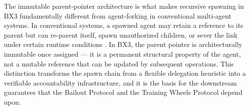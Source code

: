 The immutable parent-pointer architecture is what makes recursive spawning in BX3 fundamentally different from agent-forking in conventional multi-agent systems. In conventional systems, a spawned agent may retain a reference to its parent but can re-parent itself, spawn unauthorized children, or sever the link under certain runtime conditions \cite{agentspawn2025,firmhive2025}. In BX3, the parent pointer is architecturally immutable once assigned — it is a permanent structural property of the agent, not a mutable reference that can be updated by subsequent operations. This distinction transforms the spawn chain from a flexible delegation heuristic into a verifiable accountability infrastructure, and it is the basis for the downstream guarantees that the Bailout Protocol and the Training Wheels Protocol depend upon.